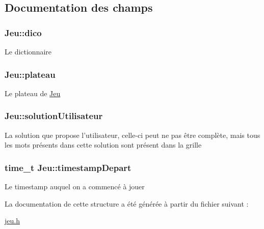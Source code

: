 \subsection{Documentation des champs}
\hypertarget{structJeu_a6bda384c6fca4e83ae15ac69f2228a41}{
\subsubsection[{dico}]{ Jeu\-::dico}}\label{structJeu_a6bda384c6fca4e83ae15ac69f2228a41}
Le dictionnaire \hypertarget{structJeu_af2931c71f6de940ec7ed3fcd2f9d7158}{
\subsubsection[{plateau}]{ Jeu\-::plateau}}\label{structJeu_af2931c71f6de940ec7ed3fcd2f9d7158}
Le plateau de \hyperlink{structJeu}{Jeu} \hypertarget{structJeu_ae8e1dca71285915404d1de4ff609a1d6}{
\subsubsection[{solution\-Utilisateur}]{ Jeu\-::solution\-Utilisateur}}\label{structJeu_ae8e1dca71285915404d1de4ff609a1d6}
La solution que propose l'utilisateur, celle-\/ci peut ne pas être complète, mais tous les mots présents dans cette solution sont présent dans la grille \hypertarget{structJeu_af48a5fddf1dc40b7c4a85918d73f201d}{
\subsubsection[{timestamp\-Depart}]{\setlength{\rightskip}{0pt plus 5cm}time\-\_\-t Jeu\-::timestamp\-Depart}}\label{structJeu_af48a5fddf1dc40b7c4a85918d73f201d}
Le timestamp auquel on a commencé à jouer 

La documentation de cette structure a été générée à partir du fichier suivant \-:\begin{DoxyCompactItemize}
\item 
\hyperlink{jeu_8h}{jeu.\-h}\end{DoxyCompactItemize}
